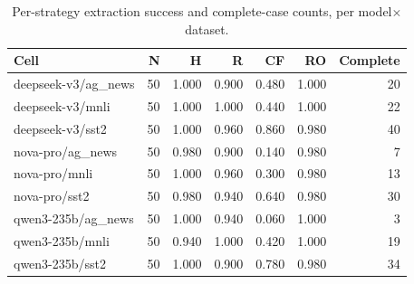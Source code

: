 \begin{table}[t]
\centering
\caption{Per-strategy extraction success and complete-case counts, per model$\times$dataset.}
\label{tab:coverage}
\begin{tabular}{lrrrrrr}
\toprule
Cell & N & H & R & CF & RO & Complete \\
\midrule
deepseek-v3/ag_news & 50 & 1.000 & 0.900 & 0.480 & 1.000 & 20 \\
deepseek-v3/mnli & 50 & 1.000 & 1.000 & 0.440 & 1.000 & 22 \\
deepseek-v3/sst2 & 50 & 1.000 & 0.960 & 0.860 & 0.980 & 40 \\
nova-pro/ag_news & 50 & 0.980 & 0.900 & 0.140 & 0.980 & 7 \\
nova-pro/mnli & 50 & 1.000 & 0.960 & 0.300 & 0.980 & 13 \\
nova-pro/sst2 & 50 & 0.980 & 0.940 & 0.640 & 0.980 & 30 \\
qwen3-235b/ag_news & 50 & 1.000 & 0.940 & 0.060 & 1.000 & 3 \\
qwen3-235b/mnli & 50 & 0.940 & 1.000 & 0.420 & 1.000 & 19 \\
qwen3-235b/sst2 & 50 & 1.000 & 0.900 & 0.780 & 0.980 & 34 \\
\bottomrule
\end{tabular}
\end{table}
